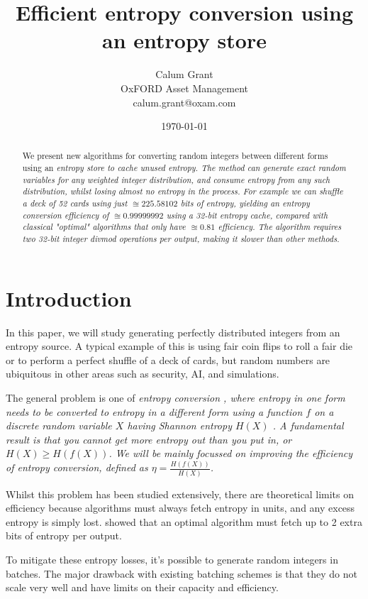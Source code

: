 \documentclass[12pt]{article}
\title{Efficient entropy conversion using an entropy store}
\author{Calum Grant \\
OxFORD Asset Management \\
calum.grant@oxam.com}
\date{\today}
\begin{document}
\maketitle

\begin{abstract}
    We present new algorithms for converting random integers between different forms using an \em entropy store \em to cache unused entropy. The method can generate exact random variables for any weighted integer distribution, and consume entropy from any such distribution, whilst losing almost no entropy in the process.  For example we can shuffle a deck of 52 cards using just $\approxeq 225.58102$ bits of entropy, yielding an entropy conversion efficiency of $\approxeq 0.99999992$ using a 32-bit entropy cache, compared with classical "optimal" algorithms that only have $\approxeq 0.81$ efficiency.  The algorithm requires two 32-bit integer divmod operations per output, making it slower than other methods.
\end{abstract}

\section{Introduction}

In this paper, we will study generating perfectly distributed integers from an entropy source. A typical example of this is using fair coin flips to roll a fair die or to perform a perfect shuffle of a deck of cards, but random numbers are ubiquitous in other areas such as security, AI, and simulations.

The general problem is one of \em entropy conversion \em, where entropy in one form needs to be converted to entropy in a different form using a function $f$ on a discrete random variable $X$ having Shannon entropy $H(X)$ \cite{shannon1948mathematical}.  A fundamental result is that you cannot get more entropy out than you put in, or $H(X) \ge H(f(X))$. We will be mainly focussed on improving the \em efficiency \em of entropy conversion, defined as $\eta = \frac{H(f(X))}{H(X)}$.

Whilst this problem has been studied extensively, there are theoretical limits on efficiency because algorithms must always fetch entropy in units, and any excess entropy is simply lost. \cite{Knuth1976TheCO} showed that an optimal algorithm must fetch up to 2 extra bits of entropy per output.

To mitigate these entropy losses, it's possible to generate random integers in batches. The major drawback with existing batching schemes is that they do not scale very well and have limits on their capacity and efficiency.
\end{document}
